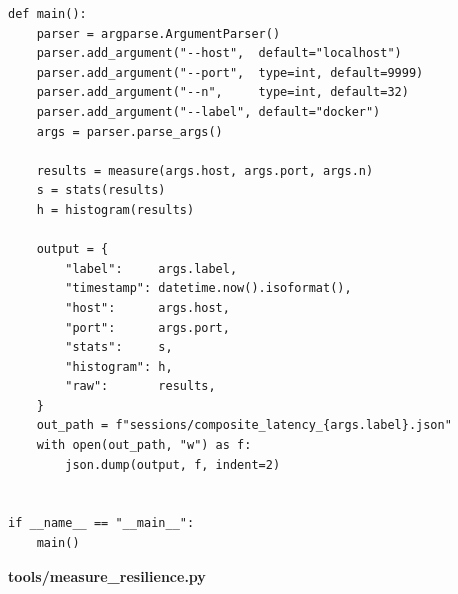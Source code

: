 \begin{lstlisting}[style=codefile, language=python3]
def main():
    parser = argparse.ArgumentParser()
    parser.add_argument("--host",  default="localhost")
    parser.add_argument("--port",  type=int, default=9999)
    parser.add_argument("--n",     type=int, default=32)
    parser.add_argument("--label", default="docker")
    args = parser.parse_args()

    results = measure(args.host, args.port, args.n)
    s = stats(results)
    h = histogram(results)

    output = {
        "label":     args.label,
        "timestamp": datetime.now().isoformat(),
        "host":      args.host,
        "port":      args.port,
        "stats":     s,
        "histogram": h,
        "raw":       results,
    }
    out_path = f"sessions/composite_latency_{args.label}.json"
    with open(out_path, "w") as f:
        json.dump(output, f, indent=2)


if __name__ == "__main__":
    main()
\end{lstlisting}

\clearpage
\vspace{0.3cm}
\noindent\textbf{\small tools/measure\_resilience.py}
\vspace{0.1cm}

